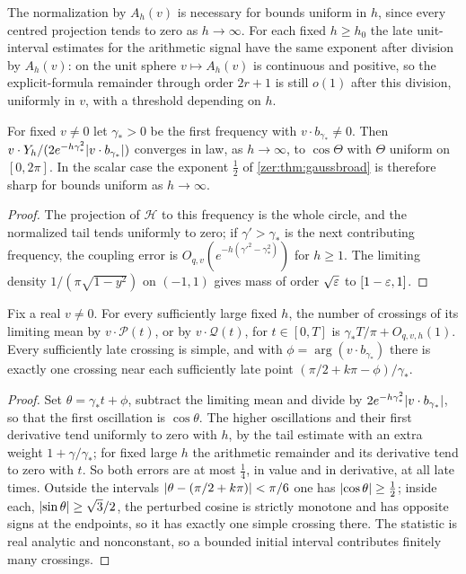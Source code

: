 The normalization by $A_h(v)$ is necessary for bounds uniform in $h$, since every centred projection
tends to zero as $h\to\infty$. For each fixed $h\ge h_0$ the late unit-interval estimates for the
arithmetic signal have the same exponent after division by $A_h(v)$: on the unit sphere
$v\mapsto A_h(v)$ is continuous and positive, so the explicit-formula remainder through order $2r+1$
is still $o(1)$ after this division, uniformly in $v$, with a threshold depending on $h$.

\begin{corollary}\label{zer:cor:gausscos}
For fixed $v\ne0$ let $\gamma_*>0$ be the first frequency with $v\cdot b_{\gamma_*}\ne0$. Then
$v\cdot Y_h/(2e^{-h\gamma_*^2}\lvert v\cdot b_{\gamma_*}\rvert)$ converges in law, as $h\to\infty$, to
$\cos\Theta$ with $\Theta$ uniform on $[0,2\pi]$. In the scalar case the exponent $\tfrac12$ of
\cref{zer:thm:gaussbroad} is therefore sharp for bounds uniform as $h\to\infty$.
\end{corollary}
\begin{proof}
The projection of $\mathcal H$ to this frequency is the whole circle, and the normalized tail tends
uniformly to zero; if $\gamma'>\gamma_*$ is the next contributing frequency, the coupling error is
$O_{q,v}(e^{-h(\gamma'^2-\gamma_*^2)})$ for $h\ge1$. The limiting density $1/(\pi\sqrt{1-y^2})$ on
$(-1,1)$ gives mass of order $\sqrt{\varepsilon}$ to $[1-\varepsilon,1]$.
\end{proof}

\begin{corollary}\label{zer:cor:gausscross}
Fix a real $v\ne0$. For every sufficiently large fixed $h$, the number of crossings of its limiting
mean by $v\cdot\mathcal P(t)$, or by $v\cdot\mathcal Q(t)$, for $t\in[0,T]$ is
$\gamma_*T/\pi+O_{q,v,h}(1)$. Every sufficiently late crossing is simple, and with
$\phi=\arg(v\cdot b_{\gamma_*})$ there is exactly one crossing near each sufficiently late point
$(\pi/2+k\pi-\phi)/\gamma_*$.
\end{corollary}
\begin{proof}
Set $\theta=\gamma_*t+\phi$, subtract the limiting mean and divide by
$2e^{-h\gamma_*^2}\lvert v\cdot b_{\gamma_*}\rvert$, so that the first oscillation is $\cos\theta$. The higher
oscillations and their first derivative tend uniformly to zero with $h$, by the tail estimate with
an extra weight $1+\gamma/\gamma_*$; for fixed large $h$ the arithmetic remainder and its derivative
tend to zero with $t$. So both errors are at most $\tfrac14$, in value and in derivative, at all late
times. Outside the intervals $\lvert\theta-(\pi/2+k\pi)\rvert<\pi/6$ one has $\lvert\cos\theta\rvert\ge\tfrac12$;
inside each, $\lvert\sin\theta\rvert\ge\sqrt3/2$, the perturbed cosine is strictly monotone and has opposite
signs at the endpoints, so it has exactly one simple crossing there. The statistic is real analytic
and nonconstant, so a bounded initial interval contributes finitely many crossings.
\end{proof}

